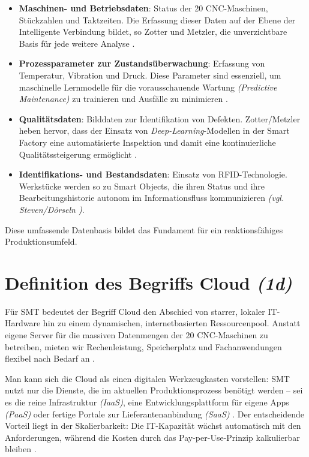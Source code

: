\begin{itemize}[leftmargin=*]
    \item \textbf{Maschinen- und Betriebsdaten}: Status der 20 \acs{CNC}-Maschinen, Stückzahlen und Taktzeiten. Die Erfassung dieser Daten auf der Ebene der \glqq Intelligente Verbindung\grqq{} bildet, so Zotter und Metzler, die unverzichtbare Basis für jede weitere Analyse \cite[5]{2}.
    
    \item \textbf{Prozessparameter zur Zustandsüberwachung}: Erfassung von Temperatur, Vibration und Druck. Diese Parameter sind essenziell, um maschinelle Lernmodelle für die vorausschauende Wartung \textit{(Predictive Maintenance)} zu trainieren und Ausfälle zu minimieren \cite[39]{2}.
    
    \item \textbf{Qualitätsdaten}: Bilddaten zur Identifikation von Defekten. Zotter/Metzler heben hervor, dass der Einsatz von \textit{Deep-Learning}-Modellen in der Smart Factory eine automatisierte Inspektion und damit eine kontinuierliche Qualitätssteigerung ermöglicht \cite[20]{2}.
    
    \item \textbf{Identifikations- und Bestandsdaten}: Einsatz von \acs{RFID}-Technologie. Werkstücke werden so zu \glqq Smart Objects\grqq, die ihren Status und ihre Bearbeitungshistorie autonom im Informationsfluss kommunizieren \textit{(\acs{vgl.} Steven/Dörseln \cite[10]{1})}.
\end{itemize}

Diese umfassende Datenbasis bildet das Fundament für ein reaktionsfähiges Produktionsumfeld.


\section{Definition des Begriffs Cloud \textit{(1d)}}
\label{sec:1d}

Für \acs{SMT} bedeutet der Begriff \glqq Cloud\grqq{} den Abschied von starrer, lokaler \acs{IT}-Hardware hin zu einem dynamischen, internetbasierten Ressourcenpool. Anstatt eigene Server für die massiven Datenmengen der 20 \acs{CNC}-Maschinen zu betreiben, mieten wir Rechenleistung, Speicherplatz und Fachanwendungen flexibel nach Bedarf an \cite[75]{1}.

Man kann sich die Cloud als einen digitalen Werkzeugkasten vorstellen: \acs{SMT} nutzt nur die Dienste, die im aktuellen Produktionsprozess benötigt werden – sei es die reine Infrastruktur \textit{(\acs{IaaS})}, eine Entwicklungsplattform für eigene Apps \textit{(\acs{PaaS})} oder fertige Portale zur Lieferantenanbindung \textit{(\acs{SaaS})} \cite[75]{1}. Der entscheidende Vorteil liegt in der Skalierbarkeit: Die \acs{IT}-Kapazität wächst automatisch mit den Anforderungen, während die Kosten durch das \glqq Pay-per-Use\grqq-Prinzip kalkulierbar bleiben \cite[76]{1}.

